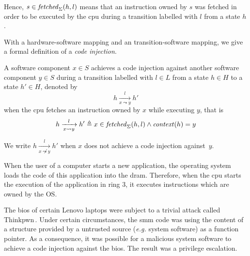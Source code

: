 Hence, $s \in \mathit{fetched}_{\Sigma}(h, l)$ means that an instruction owned by
$s$ was fetched in order to be executed by the \ac{cpu} during a transition
labelled with $l$ from a state $h$.

With a hardware-software mapping and an transition-software mapping, we give a
formal definition of a \textit{code injection}.

%

\begin{definition}
  \label{def:speccert:tempering}
  A software component $x \in S$ achieves a code injection against another
  software component $y \in S$ during a transition labelled with $l \in L$ from
  a state $h \in H$ to a state $h' \in H$, denoted by
  \[
    h \xrightarrow[x \leadsto y]{l} h'
  \]
  when the \ac{cpu} fetches an instruction owned by $x$ while executing $y$,
  that is
  \[
    h \xrightarrow[x \leadsto y]{l} h' \triangleq x \in
    \mathit{fetched}_{\Sigma}(h, l) \wedge \mathit{context}(h) = y
  \]

  We write $h \xrightarrow[x \not\leadsto y]{l} h'$ when $x$ does not achieve a
  code injection against~$y$.
\end{definition}

\begin{example}
  When the user of a computer starts a new application, the operating system
  loads the code of this application into the \ac{dram}. Therefore, when the
  \ac{cpu} starts the execution of the application in ring 3, it executes
  instructions which are owned by the OS. 
\end{example}

\begin{example}
  The \ac{bios} of certain Lenovo laptops were subject to a trivial attack
  called Thinkpwn\,\cite{cr4sh2016thinkpwn}.
  Under certain circumstances, the \ac{smm} code was using the content of a
  structure provided by a untrusted source (\emph{e.g.} system software) as a
  function pointer.
  As a consequence, it was possible for a malicious system software to achieve a
  code injection against the \ac{bios}.
  The result was a privilege escalation.
\end{example}

